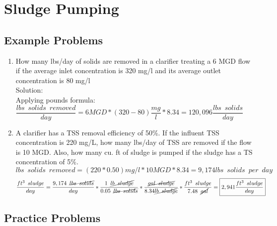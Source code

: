 \documentclass{article}
\begin{document}
\section{Sludge Pumping}

\subsection{Example Problems} 


\begin{enumerate}

\item How many lbs/day of solids are removed in a clarifier treating a 6 MGD flow if the average inlet concentration is 320 mg/l and its average outlet concentration is 80 mg/l\\
\vspace{0.5cm}
Solution:\\
\vspace{0.5cm}
Applying pounds formula:\\
$\dfrac{lbs \enspace solids \enspace removed}{day}=6MGD*(320-80)\dfrac{mg}{l}*8.34=\boxed{120,096\dfrac{lbs \enspace solids}{day}}$

\item A clarifier has a TSS removal efficiency of 50\%.  If the influent TSS concentration is 220 mg/L, how many lbs/day of TSS are removed if the flow is 10 MGD.  Also, how many cu. ft of sludge is pumped if the sludge has a TS concentration of 5\%.\\
$lbs \enspace solids \enspace removed=(220*0.50)mg/l*10MGD*8.34=9,174lbs \enspace solids \enspace per \enspace day$
$$\dfrac{ft^3\enspace sludge}{day}= \dfrac{9,174 \enspace \cancel{lbs \enspace solids}}{day} * \dfrac{1 \enspace \cancel{lb \enspace sludge}}{0.05\enspace \cancel{lbs \enspace solids}}*\dfrac{\cancel{gal \enspace sludge}}{8.34\cancel{lb \enspace sludge}}*\dfrac{ft^3 \enspace sludge}{7.48 \enspace \cancel{gal}}=\boxed{2,941\dfrac{ft^3 \enspace sludge}{day}} $$






\end{enumerate}

\subsection{Practice Problems} 
\end{document}
